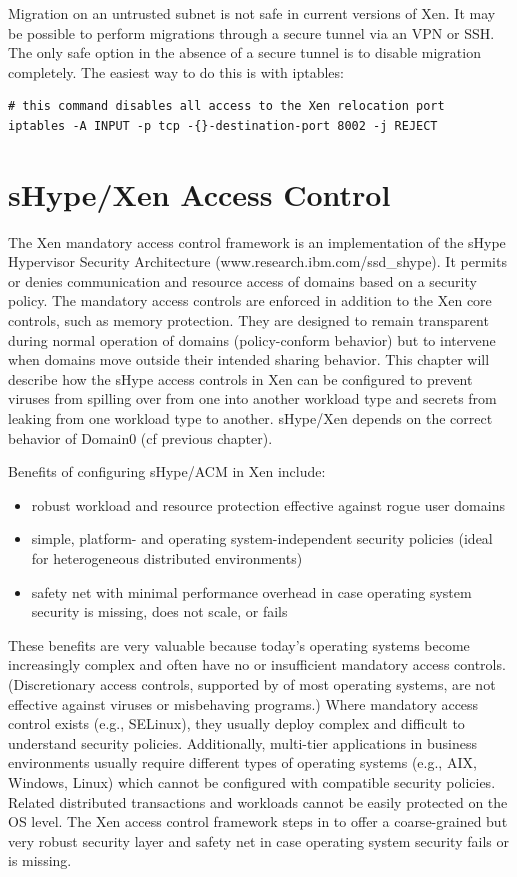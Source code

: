 \documentclass[11pt,twoside,final,openright]{report}
\begin{document}
Migration on an untrusted subnet is not safe in current versions of Xen.
It may be possible to perform migrations through a secure tunnel via an
VPN or SSH. The only safe option in the absence of a secure tunnel is to
disable migration completely. The easiest way to do this is with
iptables:

\begin{verbatim}
# this command disables all access to the Xen relocation port
iptables -A INPUT -p tcp -{}-destination-port 8002 -j REJECT
\end{verbatim}

\chapter{sHype/Xen Access Control}

The Xen mandatory access control framework is an implementation of the
sHype Hypervisor Security Architecture
(www.research.ibm.com/ssd\_shype). It permits or denies communication
and resource access of domains based on a security policy. The
mandatory access controls are enforced in addition to the Xen core
controls, such as memory protection.  They are designed to remain
transparent during normal operation of domains (policy-conform
behavior) but to intervene when domains move outside their intended
sharing behavior.  This chapter will describe how the sHype access
controls in Xen can be configured to prevent viruses from spilling
over from one into another workload type and secrets from leaking from
one workload type to another. sHype/Xen depends on the correct
behavior of Domain0 (cf previous chapter).

Benefits of configuring sHype/ACM in Xen include:
\begin{itemize}
\item robust workload and resource protection effective against rogue
  user domains
\item simple, platform- and operating system-independent security
  policies (ideal for heterogeneous distributed environments)
\item safety net with minimal performance overhead in case operating
  system security is missing, does not scale, or fails
\end{itemize}

These benefits are very valuable because today's operating systems
become increasingly complex and often have no or insufficient
mandatory access controls.  (Discretionary access controls, supported
by of most operating systems, are not effective against viruses or
misbehaving programs.)  Where mandatory access control exists (e.g.,
SELinux), they usually deploy complex and difficult to understand
security policies.  Additionally, multi-tier applications in business
environments usually require different types of operating systems
(e.g., AIX, Windows, Linux) which cannot be configured with compatible
security policies. Related distributed transactions and workloads
cannot be easily protected on the OS level. The Xen access control
framework steps in to offer a coarse-grained but very robust security
layer and safety net in case operating system security fails or is
missing.
\end{document}
